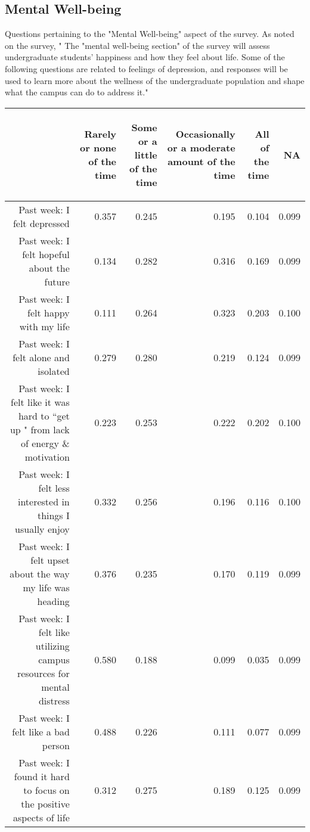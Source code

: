 \documentclass{article}\usepackage[]{graphicx}\usepackage[]{color}
\begin{document}
\newpage

\subsection{Mental Well-being}
Questions pertaining to the "Mental Well-being" aspect of the survey. As noted on the survey, "
The "mental well-being section" of the survey will assess undergraduate students’ happiness
and how they feel about life.  Some of the following questions are related to
feelings of depression, and responses will be used to learn more about the
wellness of the undergraduate population and shape what the campus can do to
address it."
\begin{table}[ht]
\centering
\begin{tabular}{rrrrrr}
  \hline
 & \begin{sideways} Rarely or none of the time \end{sideways} & \begin{sideways} Some or a little of the time \end{sideways} & \begin{sideways} Occasionally or a moderate amount of the time \end{sideways} & \begin{sideways} All of the time \end{sideways} & \begin{sideways} NA \end{sideways} \\ 
  \hline
Past week: I felt depressed & 0.357 & 0.245 & 0.195 & 0.104 & 0.099 \\ 
  Past week: I felt hopeful about the future & 0.134 & 0.282 & 0.316 & 0.169 & 0.099 \\ 
  Past week: I felt happy with my life & 0.111 & 0.264 & 0.323 & 0.203 & 0.100 \\ 
  Past week: I felt alone and isolated & 0.279 & 0.280 & 0.219 & 0.124 & 0.099 \\ 
  Past week: I felt like it was hard to ``get up " from lack of energy \& motivation & 0.223 & 0.253 & 0.222 & 0.202 & 0.100 \\ 
  	Past week: I felt less interested in things I usually enjoy & 0.332 & 0.256 & 0.196 & 0.116 & 0.100 \\ 
  	Past week: I felt upset about the way my life was heading & 0.376 & 0.235 & 0.170 & 0.119 & 0.099 \\ 
  Past week: I felt like utilizing campus resources for mental distress & 0.580 & 0.188 & 0.099 & 0.035 & 0.099 \\ 
  Past week: I felt like a bad person & 0.488 & 0.226 & 0.111 & 0.077 & 0.099 \\ 
  Past week: I found it hard to focus on the positive aspects of life & 0.312 & 0.275 & 0.189 & 0.125 & 0.099 \\ 
   \hline
\end{tabular}
\end{table}
\end{document}
